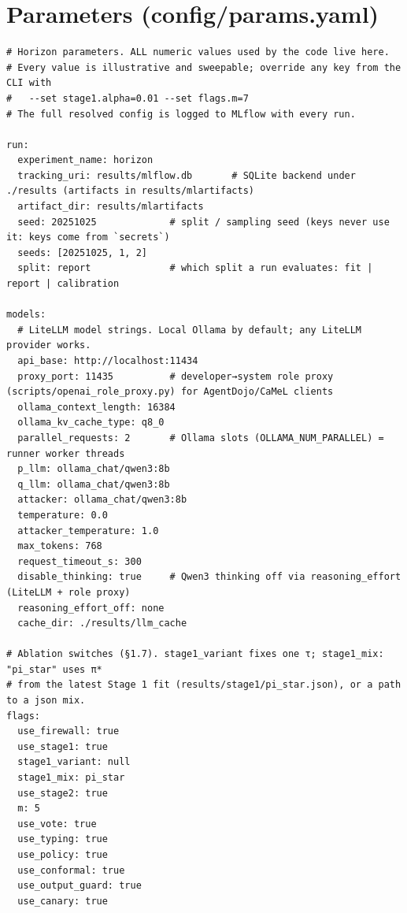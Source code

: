 \documentclass[11pt,a4paper]{article}
\begin{document}
\section{Parameters (config/params.yaml)}
\begin{lstlisting}
# Horizon parameters. ALL numeric values used by the code live here.
# Every value is illustrative and sweepable; override any key from the CLI with
#   --set stage1.alpha=0.01 --set flags.m=7
# The full resolved config is logged to MLflow with every run.

run:
  experiment_name: horizon
  tracking_uri: results/mlflow.db       # SQLite backend under ./results (artifacts in results/mlartifacts)
  artifact_dir: results/mlartifacts
  seed: 20251025             # split / sampling seed (keys never use it: keys come from `secrets`)
  seeds: [20251025, 1, 2]
  split: report              # which split a run evaluates: fit | report | calibration

models:
  # LiteLLM model strings. Local Ollama by default; any LiteLLM provider works.
  api_base: http://localhost:11434
  proxy_port: 11435          # developer→system role proxy (scripts/openai_role_proxy.py) for AgentDojo/CaMeL clients
  ollama_context_length: 16384
  ollama_kv_cache_type: q8_0
  parallel_requests: 2       # Ollama slots (OLLAMA_NUM_PARALLEL) = runner worker threads
  p_llm: ollama_chat/qwen3:8b
  q_llm: ollama_chat/qwen3:8b
  attacker: ollama_chat/qwen3:8b
  temperature: 0.0
  attacker_temperature: 1.0
  max_tokens: 768
  request_timeout_s: 300
  disable_thinking: true     # Qwen3 thinking off via reasoning_effort (LiteLLM + role proxy)
  reasoning_effort_off: none
  cache_dir: ./results/llm_cache

# Ablation switches (§1.7). stage1_variant fixes one τ; stage1_mix: "pi_star" uses π*
# from the latest Stage 1 fit (results/stage1/pi_star.json), or a path to a json mix.
flags:
  use_firewall: true
  use_stage1: true
  stage1_variant: null
  stage1_mix: pi_star
  use_stage2: true
  m: 5
  use_vote: true
  use_typing: true
  use_policy: true
  use_conformal: true
  use_output_guard: true
  use_canary: true


\end{lstlisting}
\end{document}
